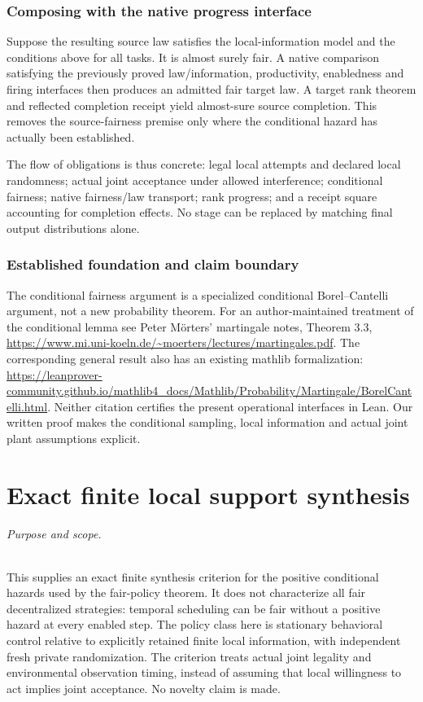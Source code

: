 \documentclass[11pt]{article}
\begin{document}
\section{Composing with the native progress interface}
Suppose the resulting source law satisfies the local-information model and the conditions above for all tasks. It is almost surely fair. A native comparison satisfying the previously proved law/information, productivity, enabledness and firing interfaces then produces an admitted fair target law. A target rank theorem and reflected completion receipt yield almost-sure source completion. This removes the source-fairness premise only where the conditional hazard has actually been established.

The flow of obligations is thus concrete: legal local attempts and declared local randomness; actual joint acceptance under allowed interference; conditional fairness; native fairness/law transport; rank progress; and a receipt square accounting for completion effects. No stage can be replaced by matching final output distributions alone.

\section{Established foundation and claim boundary}
The conditional fairness argument is a specialized conditional Borel--Cantelli argument, not a new probability theorem. For an author-maintained treatment of the conditional lemma see Peter M\"orters' martingale notes, Theorem 3.3, \url{https://www.mi.uni-koeln.de/~moerters/lectures/martingales.pdf}. The corresponding general result also has an existing mathlib formalization: \url{https://leanprover-community.github.io/mathlib4_docs/Mathlib/Probability/Martingale/BorelCantelli.html}. Neither citation certifies the present operational interfaces in Lean. Our written proof makes the conditional sampling, local information and actual joint plant assumptions explicit.

\part{Exact finite local support synthesis}

\paragraph{Purpose and scope.} This supplies an exact finite synthesis criterion for the positive conditional hazards used by the fair-policy theorem. It does not characterize all fair decentralized strategies: temporal scheduling can be fair without a positive hazard at every enabled step. The policy class here is stationary behavioral control relative to explicitly retained finite local information, with independent fresh private randomization. The criterion treats actual joint legality and environmental observation timing, instead of assuming that local willingness to act implies joint acceptance. No novelty claim is made.
\end{document}
